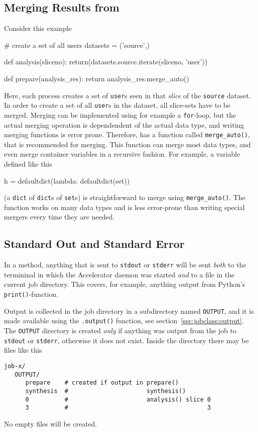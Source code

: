 \subsection{Merging Results from \analysis}
Consider this example
\begin{python}
# create a set of all users
datasets = ('source',)
  
def analysis(sliceno):
    return(datasets.source.iterate(sliceno, 'user'))

def prepare(analysis_res):
    return analysis_res.merge_auto()
\end{python}
Here, each \analysis process creates a set of \texttt{user}s seen in
that \textsl{slice} of the \texttt{source} dataset.  In order to
create a set of all \texttt{user}s in the dataset, all slice-sets have
to be merged.  Merging can be implemented using for example a
\texttt{for}-loop, but the actual merging operation is dependendent of
the actual data type, and writing merging functions is error prone.
Therefore, \analysisres has a function called \texttt{merge\_auto()},
that is recommended for merging.  This function can merge most data
types, and even merge container variables in a recursive fashion.  For
example, a variable defined like this
\begin{python}
h = defaultdict(lambda: defaultdict(set))
\end{python}
(a \texttt{dict} of \texttt{dict}s of \texttt{set}s) is
straightforward to merge using \texttt{merge\_auto()}.  The function
works on many data types and is less error-prone than writing special
mergers every time they are needed.


\subsection{Standard Out and Standard Error}
\label{sec:OUTPUT}
In a method, anything that is sent to \texttt{stdout} or
\texttt{stderr} will be sent \textsl{both} to the termininal in which
the Accelerator daemon was started \textsl{and} to a file in the
current job directory.  This covers, for example, anything output from
Python's \texttt{print()}-function.

Output is collected in the job directory in a subdirectory named
\texttt{OUTPUT}, and it is made available using the \texttt{.output()}
function, see section~\ref{sec:jobclass:output}.  The \texttt{OUTPUT}
directory is created \textsl{only} if anything was output from the job
to \texttt{stdout} or \texttt{stderr}, otherwise it does not exist.
Inside the directory there may be files like this
\begin{verbatim}
job-x/
   OUTPUT/
      prepare    # created if output in prepare()
      synthesis  #                      synthesis()
      0          #                      analysis() slice 0
      3          #                                       3
\end{verbatim}
No empty files will be created.




